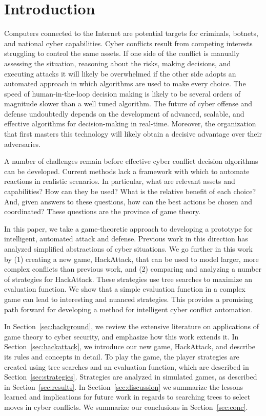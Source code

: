 \documentclass{sig-alternate}
\begin{document}

\vfill 
\eject
\section{Introduction}
\label{sec:intro}
Computers connected to the Internet are potential targets for criminals, botnets, and national cyber capabilities. Cyber conflicts result from competing interests struggling to control the same assets. If one side of the conflict is manually assessing the situation, reasoning about the risks, making decisions, and executing attacks it will likely be overwhelmed if the other side adopts an automated approach in which algorithms are used to make every choice. The speed of human-in-the-loop decision making is likely to be several orders of magnitude slower than a well tuned algorithm. The future of cyber offense and defense undoubtedly depends on the development of advanced, scalable, and effective algorithms for decision-making in real-time. Moreover, the organization that first masters this technology will likely obtain a decisive advantage over their adversaries. 

A number of challenges remain before effective cyber conflict decision algorithms can be developed. Current methods lack a framework with which to automate reactions in realistic scenarios. In particular, what are relevant assets and capabilities? How can they be used? What is the relative benefit of each choice? And, given answers to these questions, how can the best actions be chosen and coordinated? These questions are the province of game theory.

In this paper, we take a game-theoretic approach to developing a prototype for intelligent, automated attack and defense. Previous work in this direction has analyzed simplified abstractions of cyber situations. We go further in this work by (1) creating a new game, HackAttack, that can be used to model larger, more complex conflicts than previous work, and (2) comparing and analyzing a number of strategies for HackAttack. These strategies use tree searches to maximize an evaluation function. We show that a simple evaluation function in a complex game can lead to interesting and nuanced strategies. This provides a promising path forward for developing a method for intelligent cyber conflict automation.

In Section~\ref{sec:background}, we review the extensive literature on applications of game theory to cyber security, and emphasize how this work extends it. In Section~\ref{sec:hackattack}, we introduce our new game, HackAttack, and describe its rules and concepts in detail. To play the game, the player strategies are created using tree searches and an evaluation function, which are described in Section~\ref{sec:strategies}. Strategies are analyzed in simulated games, as described in Section~\ref{sec:results}. In Section~\ref{sec:discussion} we summarize the lessons learned and implications for future work in regards to searching trees to select moves in cyber conflicts. We summarize our conclusions in Section~\ref{sec:conc}.
\end{document}
